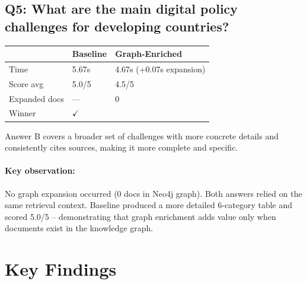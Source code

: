 \documentclass[11pt,a4paper]{article}
\newcommand{\basewinner}[1]{\textbf{\textcolor{basewin}{#1}}}
\begin{document}
\subsection{Q5: What are the main digital policy challenges for developing countries?}

\begin{tabularx}{\textwidth}{lXX}
\toprule
& \textbf{Baseline} & \textbf{Graph-Enriched} \\
\midrule
Time & 5.67s & 4.67s (+0.07s expansion) \\
Score avg & 5.0/5 & 4.5/5 \\
Expanded docs & --- & 0 \\
Winner & \basewinner{$\checkmark$} & \\
\bottomrule
\end{tabularx}

\begin{tcolorbox}[colback=judgebox, colframe=orange!40!black, title=Judge Reasoning]
Answer B covers a broader set of challenges with more concrete details and consistently cites sources, making it more complete and specific.
\end{tcolorbox}

\paragraph{Key observation:} No graph expansion occurred (0 docs in Neo4j graph). Both answers relied on the same retrieval context. Baseline produced a more detailed 6-category table and scored 5.0/5 -- demonstrating that graph enrichment adds value only when documents exist in the knowledge graph.

\section{Key Findings}
\end{document}

